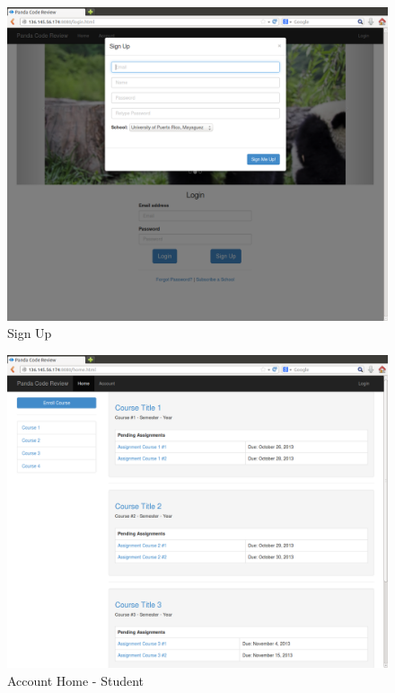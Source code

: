 \begin{figure}[H]
	\centering
	\includegraphics[width=\textwidth]{img/signup}
	\caption{Sign Up}
\end{figure}

\begin{figure}[H]
	\centering
	\includegraphics[width=\textwidth]{img/courses}
	\caption{Account Home - Student}
\end{figure}

